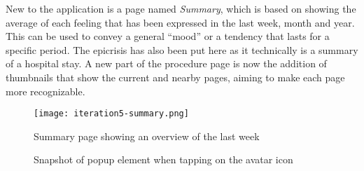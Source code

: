 New to the application is a page named \emph{Summary}, which is based on showing the average of each feeling that has been expressed in the last week, month and year. This can be used to convey a general \enquote{mood} or a tendency that lasts for a specific period. The epicrisis has also been put here as it technically is a summary of a hospital stay. A new part of the procedure page is now the addition of thumbnails that show the current and nearby pages, aiming to make each page more recognizable.

\begin{sidewaysfigure}
    \centering
    \hspace{\fill}
    \begin{minipage}[t]{0.4\textwidth}
        \vspace{0pt}
        \centering
        \texttt{[image: iteration5-summary.png]}
        \caption{Summary page showing an overview of the last week}
        \label{fig:i5-summary}
    \end{minipage}
    \hspace{\fill}
    \begin{minipage}[t]{0.3\textwidth}
        \vspace{0pt}
        \centering
        \caption{Snapshot of popup element when tapping on the avatar icon}
        \label{fig:i5-profile-popup}
    \end{minipage}
    \hspace*{\fill}
\end{sidewaysfigure}

